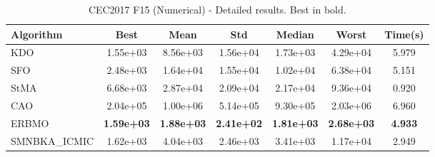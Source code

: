 \begin{table}[H]
\centering\small
\caption{CEC2017 F15 (Numerical) - Detailed results. Best in bold.}
\label{tab:cec2017_F15}
\begin{tabular}{lcccccc}
\toprule
\textbf{Algorithm} & \textbf{Best} & \textbf{Mean} & \textbf{Std} & \textbf{Median} & \textbf{Worst} & \textbf{Time(s)} \\
\midrule
KDO & 1.55e+03 & 8.56e+03 & 1.56e+04 & 1.73e+03 & 4.29e+04 & 5.979 \\
SFO & 2.48e+03 & 1.64e+04 & 1.55e+04 & 1.02e+04 & 6.38e+04 & 5.151 \\
StMA & 6.68e+03 & 2.87e+04 & 2.09e+04 & 2.17e+04 & 9.36e+04 & 0.920 \\
CAO & 2.04e+05 & 1.00e+06 & 5.14e+05 & 9.30e+05 & 2.03e+06 & 6.960 \\
ERBMO & \textbf{1.59e+03} & \textbf{1.88e+03} & \textbf{2.41e+02} & \textbf{1.81e+03} & \textbf{2.68e+03} & \textbf{4.933} \\
SMNBKA_ICMIC & 1.62e+03 & 4.04e+03 & 2.46e+03 & 3.41e+03 & 1.17e+04 & 2.949 \\
\bottomrule
\end{tabular}
\end{table}
